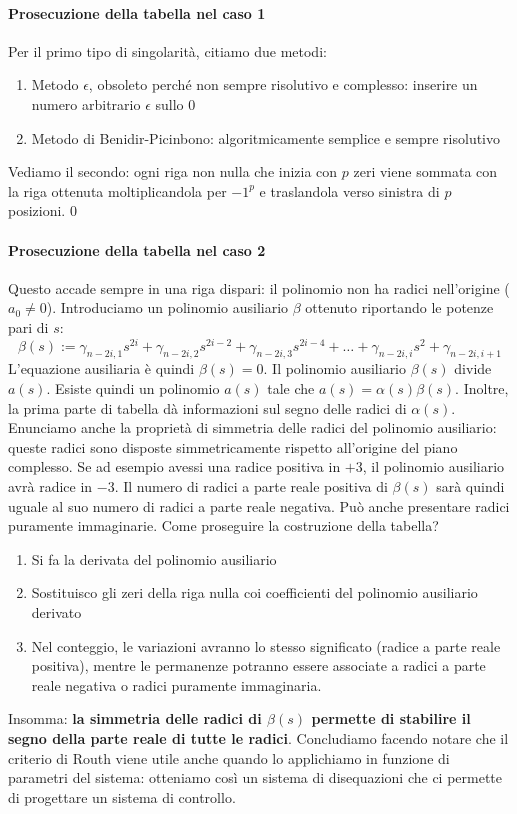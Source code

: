 \documentclass[11pt]{article}
\begin{document}
\paragraph{Prosecuzione della tabella nel caso 1} Per il primo tipo di singolarità, citiamo due metodi:
\begin{enumerate}
    \item Metodo $\epsilon$, obsoleto perché non sempre risolutivo e complesso: inserire un numero arbitrario $\epsilon$ sullo 0
    \item Metodo di Benidir-Picinbono: algoritmicamente semplice e sempre risolutivo
\end{enumerate}
Vediamo il secondo: ogni riga non nulla che inizia con $p$ zeri viene sommata con la riga ottenuta moltiplicandola per $-1^p$ e traslandola verso sinistra di $p$ posizioni.
0\paragraph{Prosecuzione della tabella nel caso 2} Questo accade sempre in una riga dispari: il polinomio non ha radici nell'origine ($a_0 \neq 0$). Introduciamo un polinomio ausiliario $\beta$ ottenuto riportando le potenze pari di $s$:
\begin{displaymath}
    \beta(s) := \gamma_{n-2i,1}s^{2i}+\gamma_{n-2i,2}s^{2i-2}+\gamma_{n-2i,3}s^{2i-4}+\dots+\gamma_{n-2i,i}s^{2}+\gamma_{n-2i,i+1}
\end{displaymath}
L'equazione ausiliaria è quindi $\beta(s) = 0$.
Il polinomio ausiliario $\beta(s)$ divide $a(s)$. Esiste quindi un polinomio $a(s)$ tale che $a(s) = \alpha(s)\beta(s)$. Inoltre, la prima parte di tabella dà informazioni sul segno delle radici di $\alpha(s)$. Enunciamo anche la proprietà di simmetria delle radici del polinomio ausiliario: queste radici sono disposte simmetricamente rispetto all'origine del piano complesso. Se ad esempio avessi una radice positiva in $+3$, il polinomio ausiliario avrà radice in $-3$. Il numero di radici a parte reale positiva di $\beta(s)$ sarà quindi uguale al suo numero di radici a parte reale negativa. Può anche presentare radici puramente immaginarie. Come proseguire la costruzione della tabella?
\begin{enumerate}
    \item Si fa la derivata del polinomio ausiliario
    \item Sostituisco gli zeri della riga nulla coi coefficienti del polinomio ausiliario derivato
    \item Nel conteggio, le variazioni avranno lo stesso significato (radice a parte reale positiva), mentre le permanenze potranno essere associate a radici a parte reale negativa o radici puramente immaginaria.
\end{enumerate}
Insomma: \textbf{la simmetria delle radici di $\beta(s)$ permette di stabilire il segno della parte reale di tutte le radici}.
Concludiamo facendo notare che il criterio di Routh viene utile anche quando lo applichiamo in funzione di parametri del sistema: otteniamo così un sistema di disequazioni che ci permette di progettare un sistema di controllo.
\end{document}

